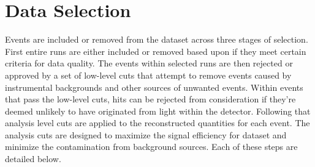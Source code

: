 %
%

\section{Data Selection}
\label{sec:data_selection}
Events are included or removed from the dataset across three stages of selection.
First entire runs are either included or removed based upon if they meet
certain criteria for data quality.
The events within selected runs are then rejected or approved by a set
of low-level cuts that attempt to remove events caused by instrumental
backgrounds and other sources of unwanted events.
Within events that pass the low-level cuts, hits can be rejected from consideration
if they're deemed unlikely to have originated from light within the detector.
Following that analysis level cuts are applied to the reconstructed quantities
for each event.
The analysis cuts are designed to maximize the signal efficiency for dataset and minimize the
contamination from background sources.
Each of these steps are detailed below.

